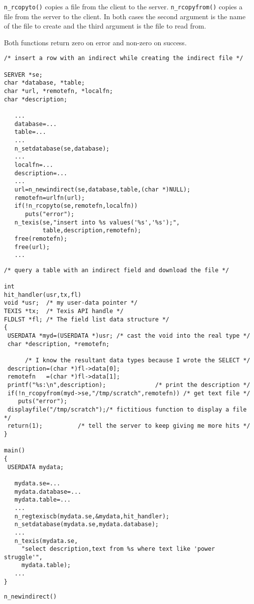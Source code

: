 \verb`n_rcopyto()` copies a file from the client to the server.
\verb`n_rcopyfrom()` copies a file from the server to the client.  In
both cases the second argument is the name of the file to create and the
third argument is the file to read from.

Both functions return zero on error and non-zero on success.

\EXAMPLE
\begin{verbatim}
/* insert a row with an indirect while creating the indirect file */

SERVER *se;
char *database, *table;
char *url, *remotefn, *localfn;
char *description;

   ...
   database=...
   table=...
   ...
   n_setdatabase(se,database);
   ...
   localfn=...
   description=...
   ...
   url=n_newindirect(se,database,table,(char *)NULL);
   remotefn=urlfn(url);
   if(!n_rcopyto(se,remotefn,localfn))
      puts("error");
   n_texis(se,"insert into %s values('%s','%s');",
           table,description,remotefn);
   free(remotefn);
   free(url);
   ...
\end{verbatim}

\EXAMPLE
\begin{verbatim}
/* query a table with an indirect field and download the file */

int
hit_handler(usr,tx,fl)
void *usr;  /* my user-data pointer */
TEXIS *tx;  /* Texis API handle */
FLDLST *fl; /* The field list data structure */
{
 USERDATA *myd=(USERDATA *)usr; /* cast the void into the real type */
 char *description, *remotefn;

      /* I know the resultant data types because I wrote the SELECT */
 description=(char *)fl->data[0];
 remotefn   =(char *)fl->data[1];
 printf("%s:\n",description);              /* print the description */
 if(!n_rcopyfrom(myd->se,"/tmp/scratch",remotefn)) /* get text file */
    puts("error");
 displayfile("/tmp/scratch");/* fictitious function to display a file */
 return(1);          /* tell the server to keep giving me more hits */
}

main()
{
 USERDATA mydata;

   mydata.se=...
   mydata.database=...
   mydata.table=...
   ...
   n_regtexiscb(mydata.se,&mydata,hit_handler);
   n_setdatabase(mydata.se,mydata.database);
   ...
   n_texis(mydata.se,
     "select description,text from %s where text like 'power struggle'",
     mydata.table);
   ...
}
\end{verbatim}

\SEE
\verb`n_newindirect()`

